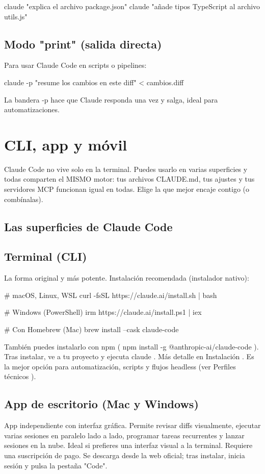 \documentclass[11pt,a4paper]{book}
\begin{document}
\begin{codebox}
claude "explica el archivo package.json"
claude "añade tipos TypeScript al archivo utils.js"
\end{codebox}
\section{Modo "print" (salida directa)}
Para usar Claude Code en scripts o pipelines:

\begin{codebox}
claude -p "resume los cambios en este diff" < cambios.diff
\end{codebox}
La bandera -p hace que Claude responda una vez y salga, ideal para automatizaciones.

\chapter{CLI, app y móvil}
Claude Code no vive solo en la terminal. Puedes usarlo en varias superficies y todas comparten el MISMO motor: tus archivos CLAUDE.md, tus ajustes y tus servidores MCP funcionan igual en todas. Elige la que mejor encaje contigo (o combínalas).

\section{Las superficies de Claude Code}
\section{Terminal (CLI)}
La forma original y más potente. Instalación recomendada (instalador nativo):

\begin{codebox}
# macOS, Linux, WSL
curl -fsSL https://claude.ai/install.sh | bash

# Windows (PowerShell)
irm https://claude.ai/install.ps1 | iex

# Con Homebrew (Mac)
brew install --cask claude-code
\end{codebox}
También puedes instalarlo con npm ( npm install -g @anthropic-ai/claude-code ). Tras instalar, ve a tu proyecto y ejecuta claude . Más detalle en Instalación . Es la mejor opción para automatización, scripts y flujos headless (ver Perfiles técnicos ).

\section{App de escritorio (Mac y Windows)}
App independiente con interfaz gráfica. Permite revisar diffs visualmente, ejecutar varias sesiones en paralelo lado a lado, programar tareas recurrentes y lanzar sesiones en la nube. Ideal si prefieres una interfaz visual a la terminal. Requiere una suscripción de pago. Se descarga desde la web oficial; tras instalar, inicia sesión y pulsa la pestaña "Code".
\end{document}
